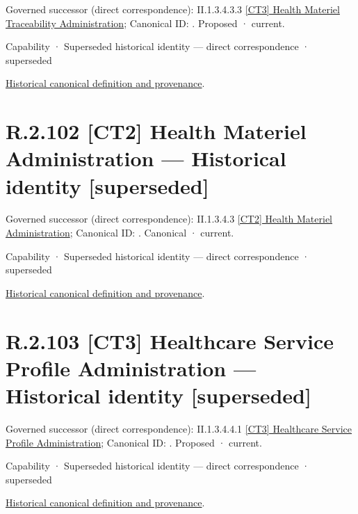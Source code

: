 {\small Governed successor (direct correspondence): II.1.3.4.3.3 \hyperref[element:2d41ed0f00a94a4b90ffe87d6fd4e9fe]{[CT3] Health Materiel Traceability Administration}; Canonical ID: \texttt{}. Proposed · current.}\par
\label{element:f1b888e8d50c4019ac1afe162d6223f3}
{\small Capability · Superseded historical identity — direct correspondence · superseded}\par
\href{../../../../../../../continuum/strategy/capability/f1b888e8d50c4019ac1afe162d6223f3.md}{Historical canonical definition and provenance}.\par
\section*{R.2.102 [CT2] Health Materiel Administration — Historical identity [superseded]}
\label{navigation:R.2.102}

{\small Governed successor (direct correspondence): II.1.3.4.3 \hyperref[element:e7081070a9f8444f81c1d8fce37ef664]{[CT2] Health Materiel Administration}; Canonical ID: \texttt{}. Canonical · current.}\par
\label{element:4952f86078c54a8d898ac992e6f4f577}
{\small Capability · Superseded historical identity — direct correspondence · superseded}\par
\href{../../../../../../../continuum/strategy/capability/4952f86078c54a8d898ac992e6f4f577.md}{Historical canonical definition and provenance}.\par
\section*{R.2.103 [CT3] Healthcare Service Profile Administration — Historical identity [superseded]}
\label{navigation:R.2.103}

{\small Governed successor (direct correspondence): II.1.3.4.4.1 \hyperref[element:e75d5eb30936476ea7a9cbadfa43d5ef]{[CT3] Healthcare Service Profile Administration}; Canonical ID: \texttt{}. Proposed · current.}\par
\label{element:7780ca2fed2346439d5f559d00cc4ee4}
{\small Capability · Superseded historical identity — direct correspondence · superseded}\par
\href{../../../../../../../continuum/strategy/capability/7780ca2fed2346439d5f559d00cc4ee4.md}{Historical canonical definition and provenance}.\par
